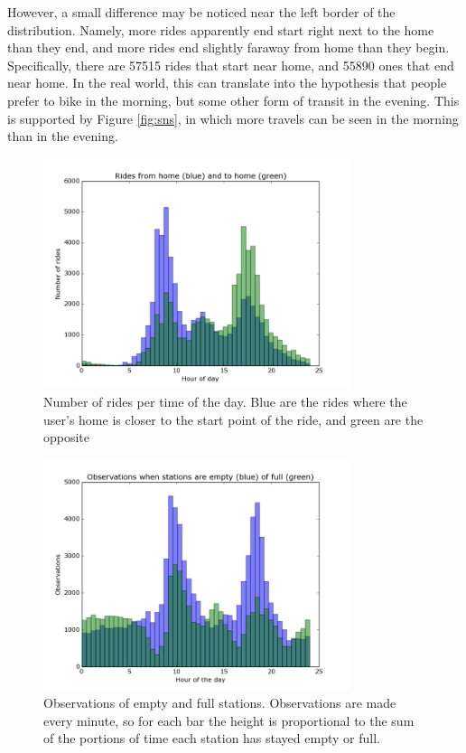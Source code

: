 \documentclass{article}
\begin{document}
However, a small difference may be noticed near the left border of the distribution. Namely, more rides apparently end start right next to the home than they end, and more rides end slightly faraway from home than they begin. Specifically, there are 57515 rides that start near home, and 55890 ones that end near home. In the real world, this can translate into the hypothesis that people prefer to bike in the morning, but some other form of transit in the evening. This is supported by Figure \ref{fig:sns}, in which more travels can be seen in the morning than in the evening.

\begin{figure}
	\centering
	\includegraphics[width=0.8\textwidth]{../rides_from_home_to_home.png}
	\caption{Number of rides per time of the day. Blue are the rides where the user's home is closer to the start point of the ride, and green are the opposite}
	\label{fig:ridestofromhome}
\end{figure}

\begin{figure}
	\centering
	\includegraphics[width=0.8\textwidth]{../empty_full_stations.png}
	\caption{Observations of empty and full stations. Observations are made every minute, so for each bar the height is proportional to the sum of the portions of time each station has stayed empty or full. }
	\label{fig:emptyfull}
\end{figure}
\end{document}
